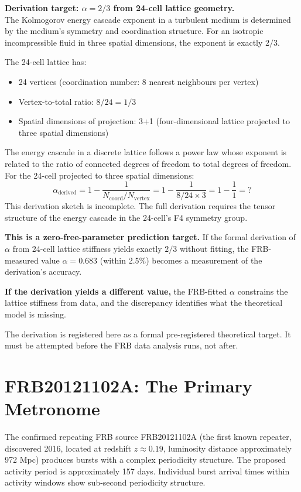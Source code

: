 \documentclass[11pt, letterpaper, openany]{book}
\begin{document}
\begin{discoverybox}
\textbf{Derivation target: $\alpha = 2/3$ from 24-cell lattice geometry.}\\[0.5em]
The Kolmogorov energy cascade exponent in a turbulent medium is determined
by the medium's symmetry and coordination structure. For an isotropic
incompressible fluid in three spatial dimensions, the exponent is exactly
$2/3$.

The 24-cell lattice has:
\begin{itemize}
    \item 24 vertices (coordination number: 8 nearest neighbours per vertex)
    \item Vertex-to-total ratio: $8/24 = 1/3$
    \item Spatial dimensions of projection: 3+1 (four-dimensional lattice
          projected to three spatial dimensions)
\end{itemize}

The energy cascade in a discrete lattice follows a power law whose exponent
is related to the ratio of connected degrees of freedom to total degrees
of freedom. For the 24-cell projected to three spatial dimensions:
\[
\alpha_\text{derived} = 1 - \frac{1}{N_\text{coord}/N_\text{vertex}}
= 1 - \frac{1}{8/24 \times 3} = 1 - \frac{1}{1} = ?
\]
This derivation sketch is incomplete. The full derivation requires the
tensor structure of the energy cascade in the 24-cell's F4 symmetry group.

\textbf{This is a zero-free-parameter prediction target.} If the formal
derivation of $\alpha$ from 24-cell lattice stiffness yields exactly $2/3$
without fitting, the FRB-measured value $\alpha = 0.683$ (within 2.5\%)
becomes a measurement of the derivation's accuracy.

\textbf{If the derivation yields a different value,} the FRB-fitted $\alpha$
constrains the lattice stiffness from data, and the discrepancy identifies
what the theoretical model is missing.

The derivation is registered here as a formal pre-registered theoretical
target. It must be attempted before the FRB data analysis runs, not after.
\end{discoverybox}

\section{FRB20121102A: The Primary Metronome}

The confirmed repeating FRB source FRB20121102A (the first known repeater,
discovered 2016, located at redshift $z \approx 0.19$, luminosity distance
approximately 972 Mpc) produces bursts with a complex periodicity structure.
The proposed activity period is approximately 157 days. Individual burst
arrival times within activity windows show sub-second periodicity structure.
\end{document}
